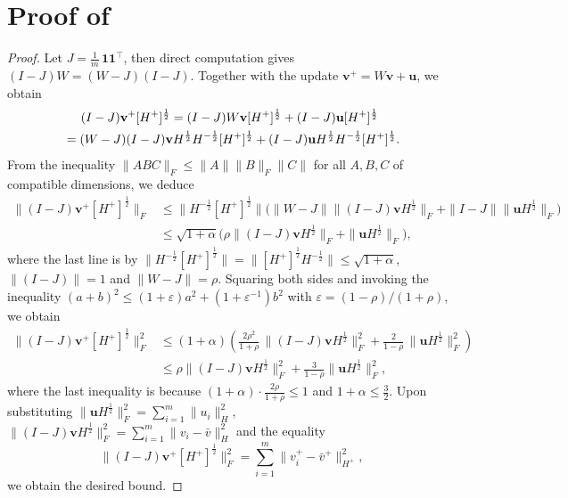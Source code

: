 \documentclass{article}
\theoremstyle{plain}
\theoremstyle{definition}
\theoremstyle{remark}
\newcommand{\one}{\mathbf{1}}
\newcommand{\bv}{\mathbf{v}}
\newcommand{\bu}{\mathbf{u}}
\begin{document}
\section{Proof of \texorpdfstring{}{Lemma }}
\label{appendix: Lemma-contraction} 
\begin{proof}%
    Let $J=\frac1m\,\one\one^\top$, then direct computation gives $(I-J)W=(W-J)(I-J)$. Together with the update $\bv^+=W\bv + \bu$, we obtain
    \begin{equation*} \begin{aligned}
        &\hspace{5mm}(I-J)\bv^+  [H^+]^{\frac12} = (I-J)W\bv  [H^+]^{\frac12} + (I-J)\bu [H^+]^{\frac12} \\
        &=(W-J) (I-J)\bv H^{\frac12} H^{-\frac12}[H^+]^{\frac12} + (I-J)  \bu H^{\frac12} H^{-\frac12}[H^+]^{\frac12}.
    \end{aligned} \end{equation*}
    From the inequality $\|ABC\|_F \leq \|A\|\|B\|_F\|C\|$ for all $A,B,C$ of compatible dimensions, we deduce
\begin{equation}\label{eq:Appendix contraction}
\begin{aligned}
    \big\|(I\!-\!J)\bv^+ [H^+]^{\frac12}\!\big\|_{\!F}  &\leq \big\| H^{-\frac12}[H^+]^{\frac12} \big\| \Big( \|W\!-\!J\| \|(I\!-\!J)\bv  H^{\frac12}\|_F + \|I\!-\!J\| \| \bu H^{\frac12}\|_F \Big)\\
    & \leq  \sqrt{1+\alpha} \Big(\rho \| (I-J)\bv H^{\frac12}\|_F + \| \bu H^{\frac12}\|_F \Big),
   \end{aligned}
\end{equation}
%
where the last line is by $\big\| H^{-\frac12}[H^+]^{\frac12} \big\| = \big\| [H^+]^{\frac12} H^{-\frac12} \big\| \leq \sqrt{1+\alpha}$, $\|(I-J) \|=1$ and $\|W-J\|=\rho$.
Squaring both sides and invoking the inequality $(a+b)^2 \leq (1+\varepsilon)a^2 + (1+\varepsilon^{-1})b^2$ with $\varepsilon=(1-\rho)/(1+\rho)$, we obtain 
\begin{equation*} \begin{aligned}
    \big\|(I-J)\bv^+ [H^+]^{\frac12}\big\|_F^2 & \leq  (1+\alpha)\left(\frac{2\rho^2}{1+\rho} \, \big\| (I-J)\bv H^{\frac12} \big\|_F^2 + \frac{2}{1-\rho}\, \big\| \bu H^{\frac12} \big\|_F^2 \right)\\
    & \leq  \rho \big\| (I-J)\bv H^{\frac12} \big\|_F^2 + \frac{3}{1-\rho}  \big\| \bu H^{\frac12} \big\|_F^2,
\end{aligned} \end{equation*} 
where the last inequality is because $(1+\alpha)\cdot \frac{2\rho}{1+\rho} \leq 1$ and $1+\alpha \leq \frac32$. 
Upon substituting 
$\| \bu H^{\frac12}\|_F^2={\sum}_{i=1}^m \|u_i\|^2_{H}$, $\| (I-J)\bv H^{\frac12}\|_F^2 = {\sum}_{i=1}^m\|v_i - \bar v\|^2_{H}$ and the equality 
\[ \big\|(I-J)\bv^+ [H^+]^{\frac12} \big\|_F^2 = {\sum}_{i=1}^m \big\|v_i^+ - \bar v^+ \big\|^2_{H^+},\] 
we obtain the desired bound.
\end{proof}
 
\end{document}
